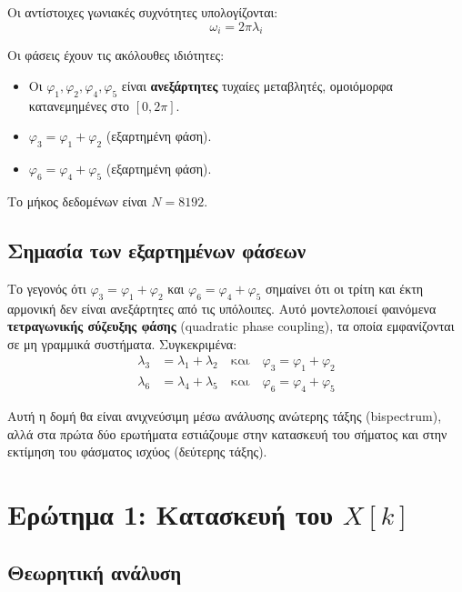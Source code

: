 \documentclass[a4paper,12pt]{article}
\begin{document}
Οι αντίστοιχες γωνιακές συχνότητες υπολογίζονται:
\begin{equation}
    \omega_i = 2\pi\lambda_i
\end{equation}

Οι φάσεις έχουν τις ακόλουθες ιδιότητες:
\begin{itemize}
    \item Οι $\varphi_1, \varphi_2, \varphi_4, \varphi_5$ είναι \textbf{ανεξάρτητες} τυχαίες μεταβλητές, ομοιόμορφα κατανεμημένες στο $[0, 2\pi]$.
    \item $\varphi_3 = \varphi_1 + \varphi_2$ (εξαρτημένη φάση).
    \item $\varphi_6 = \varphi_4 + \varphi_5$ (εξαρτημένη φάση).
\end{itemize}

Το μήκος δεδομένων είναι $N = 8192$.

\subsection{Σημασία των εξαρτημένων φάσεων}

Το γεγονός ότι $\varphi_3 = \varphi_1 + \varphi_2$ και $\varphi_6 = \varphi_4 + \varphi_5$ σημαίνει ότι οι τρίτη και έκτη αρμονική δεν είναι ανεξάρτητες από τις υπόλοιπες. Αυτό μοντελοποιεί φαινόμενα \textbf{τετραγωνικής σύζευξης φάσης} (quadratic phase coupling), τα οποία εμφανίζονται σε μη γραμμικά συστήματα. Συγκεκριμένα:
\begin{align}
    \lambda_3 &= \lambda_1 + \lambda_2 \quad \text{και} \quad \varphi_3 = \varphi_1 + \varphi_2 \\
    \lambda_6 &= \lambda_4 + \lambda_5 \quad \text{και} \quad \varphi_6 = \varphi_4 + \varphi_5
\end{align}

Αυτή η δομή θα είναι ανιχνεύσιμη μέσω ανάλυσης ανώτερης τάξης (bispectrum), αλλά στα πρώτα δύο ερωτήματα εστιάζουμε στην κατασκευή του σήματος και στην εκτίμηση του φάσματος ισχύος (δεύτερης τάξης).

\newpage
\section{Ερώτημα 1: Κατασκευή του $X[k]$}

\subsection{Θεωρητική ανάλυση}
\end{document}

